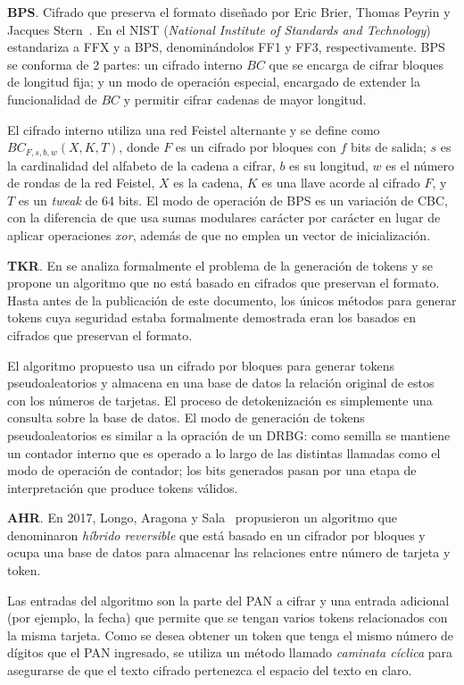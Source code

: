 \textbf{BPS}. Cifrado que preserva el formato diseñado por Eric Brier, Thomas
Peyrin y Jacques Stern~\cite{bps}. En \cite{nist_fpe} el NIST (\textit{National
Institute of Standards and Technology}) estandariza a FFX y a BPS,
denominándolos FF1 y FF3, respectivamente. BPS se conforma de 2 partes: un
cifrado interno $BC$ que se encarga de cifrar bloques de longitud fija; y un
modo de operación especial, encargado de extender la funcionalidad de $BC$ y
permitir cifrar cadenas de mayor longitud.

El cifrado interno utiliza una red Feistel alternante y se define como
$BC_{F,s,b,w}(X,K,T)$, donde $F$ es un cifrado por bloques con $f$ bits de
salida; $s$ es la cardinalidad del alfabeto de la cadena a cifrar, $b$ es su
longitud, $w$ es el número de rondas de la red Feistel, $X$ es la cadena, $K$ es
una llave acorde al cifrado $F$, y $T$ es un \textit{tweak} de 64 bits. El modo
de operación de BPS es un variación de CBC, con la diferencia de que usa sumas
modulares carácter por carácter en lugar de aplicar operaciones \textit{xor},
además de que no emplea un vector de inicialización.

\textbf{TKR}. En \cite{doc_sandra} se analiza formalmente el problema de la
generación de tokens y se propone un algoritmo que no está basado en cifrados
que preservan el formato. Hasta antes de la publicación de este documento, los
únicos métodos para generar tokens cuya seguridad estaba formalmente demostrada
eran los basados en cifrados que preservan el formato.

El algoritmo propuesto usa un cifrado por bloques para generar tokens
pseudoaleatorios y almacena en una base de datos la relación original de estos
con los números de tarjetas. El proceso de detokenización es simplemente una
consulta sobre la base de datos. El modo de generación de tokens
pseudoaleatorios es similar a la opración de un DRBG: como semilla se mantiene
un contador interno que es operado a lo largo de las distintas llamadas como el
modo de operación de contador; los bits generados pasan por una etapa de
interpretación que produce tokens válidos.

\textbf{AHR}. En 2017, Longo, Aragona y Sala~\cite{aragona} propusieron un
algoritmo que denominaron \textit{híbrido reversible} que está basado en un
cifrador por bloques y ocupa una base de datos para almacenar las relaciones
entre número de tarjeta y token.

Las entradas del algoritmo son la parte del PAN a cifrar y una
entrada adicional (por ejemplo, la fecha) que permite que se tengan varios
tokens relacionados con la misma tarjeta. Como se desea obtener un token que
tenga el mismo número de dígitos que el PAN ingresado, se utiliza un método
llamado \textit{caminata cíclica} para asegurarse de que el texto cifrado
pertenezca el espacio del texto en claro.

